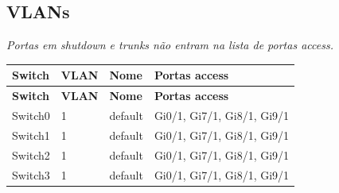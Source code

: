 \subsection{VLANs}
\noindent\textit{Portas em shutdown e trunks não entram na lista de portas access.}\par\smallskip
\begingroup\scriptsize\setlength{\tabcolsep}{3pt}
\begin{longtable}{@{}p{}p{}p{}p{}@{}}
\toprule \textbf{Switch} & \textbf{VLAN} & \textbf{Nome} & \textbf{Portas access} \\\midrule\endfirsthead
\toprule \textbf{Switch} & \textbf{VLAN} & \textbf{Nome} & \textbf{Portas access} \\\midrule\endhead
Switch0 & 1 & default & Gi0/1, Gi7/1, Gi8/1, Gi9/1 \\
Switch1 & 1 & default & Gi0/1, Gi7/1, Gi8/1, Gi9/1 \\
Switch2 & 1 & default & Gi0/1, Gi7/1, Gi8/1, Gi9/1 \\
Switch3 & 1 & default & Gi0/1, Gi7/1, Gi8/1, Gi9/1 \\
\bottomrule
\end{longtable}\endgroup

